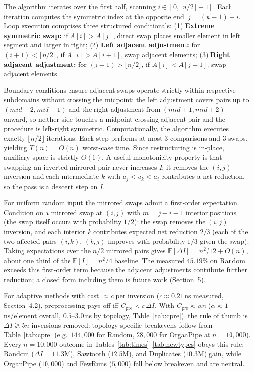 \documentclass[namedate,webpdf,contemporary,large]{TBench-template}%
\theoremstyle{thmstyleone}%
\theoremstyle{thmstyletwo}%
\theoremstyle{thmstylethree}%
\begin{document}
The algorithm iterates over the first half, scanning $i \in [0, \lfloor n/2 \rfloor - 1]$. Each iteration computes the symmetric index at the opposite end, $j=(n-1)-i$. Loop execution comprises three structured conditionals: (1) \textbf{Extreme symmetric swap:} if $A[i] > A[j]$, direct swap places smaller element in left segment and larger in right; (2) \textbf{Left adjacent adjustment:} for $(i+1) < \lfloor n/2 \rfloor$, if $A[i] > A[i+1]$, swap adjacent elements; (3) \textbf{Right adjacent adjustment:} for $(j-1) > \lfloor n/2 \rfloor$, if $A[j] < A[j-1]$, swap adjacent elements.

Boundary conditions ensure adjacent swaps operate strictly within respective subdomains without crossing the midpoint: the left adjustment covers pairs up to $(mid{-}2,mid{-}1)$ and the right adjustment from $(mid{+}1,mid{+}2)$ onward, so neither side touches a midpoint-crossing adjacent pair and the procedure is left-right symmetric. Computationally, the algorithm executes exactly $\lfloor n/2 \rfloor$ iterations. Each step performs at most 3 comparisons and 3 swaps, yielding $T(n)=O(n)$ worst-case time. Since restructuring is in-place, auxiliary space is strictly $O(1)$. A useful monotonicity property is that swapping an inverted mirrored pair never increases $I$: it removes the $(i,j)$ inversion and each intermediate $k$ with $a_j<a_k<a_i$ contributes a net reduction, so the pass is a descent step on $I$.

For uniform random input the mirrored swaps admit a first-order expectation. Condition on a mirrored swap at $(i,j)$ with $m=j-i-1$ interior positions (the swap itself occurs with probability $1/2$): the swap removes the $(i,j)$ inversion, and each interior $k$ contributes expected net reduction $2/3$ (each of the two affected pairs $(i,k)$, $(k,j)$ improves with probability $1/3$ given the swap). Taking expectations over the $n/2$ mirrored pairs gives $\mathbb{E}[\Delta I]=n^2/12+O(n)$, about one third of the $\mathbb{E}[I]=n^2/4$ baseline. The measured $45.19\%$ on Random exceeds this first-order term because the adjacent adjustments contribute further reduction; a closed form including them is future work (Section~5).

For adaptive methods with cost $\approx c$ per inversion ($c\approx0.21$\,ns measured, Section~4.2), preprocessing pays off iff $C_{\text{pre}} < c\,\Delta I$. With $C_{\text{pre}}\approx\alpha n$ ($\alpha\approx1$\,ns/element overall, $0.5$--$3.0$\,ns by topology, Table~\ref{tab:cpre}), the rule of thumb is $\Delta I \gtrsim 5n$ inversions removed; topology-specific breakevens follow from Table~\ref{tab:cpre} (e.g.\ $144{,}000$ for Random, $28{,}000$ for OrganPipe at $n{=}10{,}000$). Every $n{=}10{,}000$ outcome in Tables~\ref{tab:times}--\ref{tab:newtypes} obeys this rule: Random ($\Delta I{=}11.3$M), Sawtooth ($12.5$M), and Duplicates ($10.3$M) gain, while OrganPipe ($10{,}000$) and FewRuns ($5{,}000$) fall below breakeven and are neutral.
\end{document}

